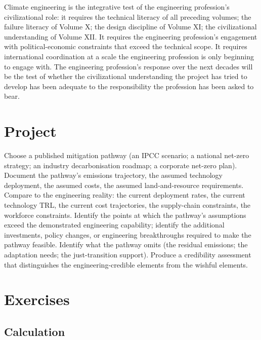 \begin{principle}
Climate engineering is the integrative test of the engineering profession's civilizational role: it requires the technical literacy of all preceding volumes; the failure literacy of Volume X; the design discipline of Volume XI; the civilizational understanding of Volume XII. It requires the engineering profession's engagement with political-economic constraints that exceed the technical scope. It requires international coordination at a scale the engineering profession is only beginning to engage with. The engineering profession's response over the next decades will be the test of whether the civilizational understanding the project has tried to develop has been adequate to the responsibility the profession has been asked to bear.
\end{principle}

\section{Project}

\begin{project}
Choose a published mitigation pathway (an IPCC scenario; a national net-zero strategy; an industry decarbonisation roadmap; a corporate net-zero plan). Document the pathway's emissions trajectory, the assumed technology deployment, the assumed costs, the assumed land-and-resource requirements. Compare to the engineering reality: the current deployment rates, the current technology TRL, the current cost trajectories, the supply-chain constraints, the workforce constraints. Identify the points at which the pathway's assumptions exceed the demonstrated engineering capability; identify the additional investments, policy changes, or engineering breakthroughs required to make the pathway feasible. Identify what the pathway omits (the residual emissions; the adaptation needs; the just-transition support). Produce a credibility assessment that distinguishes the engineering-credible elements from the wishful elements.
\end{project}

\section{Exercises}

\subsection*{Calculation}


